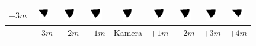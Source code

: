 \begin{tabular}{|c|c|c|c|c|c|c|c|c|}
	\hline 
	$+3m$ &
	\includegraphics[width=0.5cm]{img_Bereich/V2_vid_res_Winkel_Y_-3000_3000.png}&
	\includegraphics[width=0.5cm]{img_Bereich/V2_vid_res_Winkel_Y_-2000_3000.png}&
	\includegraphics[width=0.5cm]{img_Bereich/V2_vid_res_Winkel_Y_-1000_3000.png}&
	\includegraphics[width=0.5cm]{img_Bereich/V2_vid_res_Winkel_Y_0_3000.png}&
	\includegraphics[width=0.5cm]{img_Bereich/V2_vid_res_Winkel_Y_1000_3000.png}&
	\includegraphics[width=0.5cm]{img_Bereich/V2_vid_res_Winkel_Y_2000_3000.png}&
	\includegraphics[width=0.5cm]{img_Bereich/V2_vid_res_Winkel_Y_3000_3000.png}&
	\includegraphics[width=0.5cm]{img_Bereich/V2_vid_res_Winkel_Y_4000_3000.png}\\ 
	\hline 
	& $-3m$ & $-2m$ & $-1m$ &Kamera& $+1m$ & $+2m$ & $+3m$ & $+4m$ \\ 
	\hline 
\end{tabular}{\tiny }